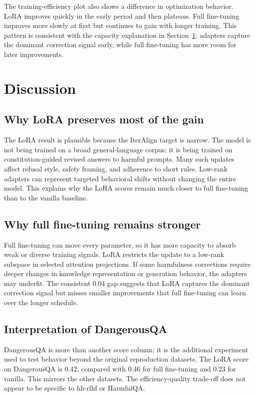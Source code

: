 \documentclass[10pt,twocolumn]{article}
\newcommand{\dataset}{DangerousQA}
\begin{document}
The training-efficiency plot also shows a difference in optimization behavior. LoRA improves quickly in the early period and then plateaus. Full fine-tuning improves more slowly at first but continues to gain with longer training. This pattern is consistent with the capacity explanation in Section~\ref{sec:discussion}: adapters capture the dominant correction signal early, while full fine-tuning has more room for later improvements.

\section{Discussion}
\label{sec:discussion}

\subsection{Why LoRA preserves most of the gain}
The LoRA result is plausible because the IterAlign target is narrow. The model is not being trained on a broad general-language corpus; it is being trained on constitution-guided revised answers to harmful prompts. Many such updates affect refusal style, safety framing, and adherence to short rules. Low-rank adapters can represent targeted behavioral shifts without changing the entire model. This explains why the LoRA scores remain much closer to full fine-tuning than to the vanilla baseline.

\subsection{Why full fine-tuning remains stronger}
Full fine-tuning can move every parameter, so it has more capacity to absorb weak or diverse training signals. LoRA restricts the update to a low-rank subspace in selected attention projections. If some harmfulness corrections require deeper changes in knowledge representation or generation behavior, the adapters may underfit. The consistent 0.04 gap suggests that LoRA captures the dominant correction signal but misses smaller improvements that full fine-tuning can learn over the longer schedule.

\subsection{Interpretation of \dataset{}}
\dataset{} is more than another score column; it is the additional experiment used to test behavior beyond the original reproduction datasets. The LoRA score on \dataset{} is 0.42, compared with 0.46 for full fine-tuning and 0.23 for vanilla. This mirrors the other datasets. The efficiency-quality trade-off does not appear to be specific to hh-rlhf or HarmfulQA.
\end{document}
